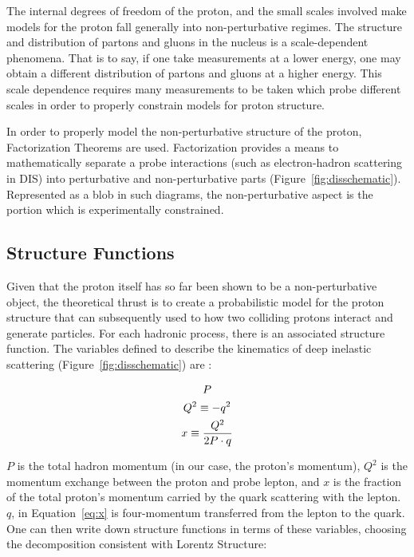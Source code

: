 The internal degrees of freedom of the proton, and the small scales involved
make models for the proton fall generally into non-perturbative regimes.  The
structure and distribution of partons and gluons in the nucleus is a
scale-dependent phenomena. That is to say, if one take measurements at a lower
energy, one may obtain a different distribution of partons and gluons at a
higher energy. This scale dependence requires many measurements to be taken
which probe different scales in order to properly constrain models for proton
structure. 

In order to properly model the non-perturbative structure of the proton,
Factorization Theorems are used. Factorization provides a means to
mathematically separate a probe interactions (such as electron-hadron scattering
in DIS) into perturbative and non-perturbative parts
(Figure~\ref{fig:disschematic}). Represented as a blob in such diagrams, the
non-perturbative aspect is the portion which is experimentally constrained.

\subsection{Structure Functions}
\label{sec:structure_functions}

Given that the proton itself has so far been shown to be a non-perturbative
object, the theoretical thrust is to create a probabilistic model for the proton
structure that can subsequently used to how two colliding protons interact and
generate particles. For each hadronic process, there is an associated structure
function. The variables defined to describe the kinematics of deep inelastic
scattering (Figure~\ref{fig:disschematic}) are :

\begin{gather}
  P \label{eq:P}\\
  Q^2 \equiv -q^2 \label{eq:big_q_sq}\\
  x \equiv { Q^2 \over {2P\cdot q} } \label{eq:x}
\end{gather}

{\noindent}$P$ is the total hadron momentum (in our case, the proton's
momentum), $Q^2$ is the momentum exchange between the proton and probe lepton,
and $x$ is the fraction of the total proton's momentum carried by the quark
scattering with the lepton.  $q$, in Equation~\ref{eq:x} is four-momentum
transferred from the lepton to the quark. \\

{\noindent}One can then write down structure functions in terms of these
variables, choosing the decomposition consistent with Lorentz Structure:

